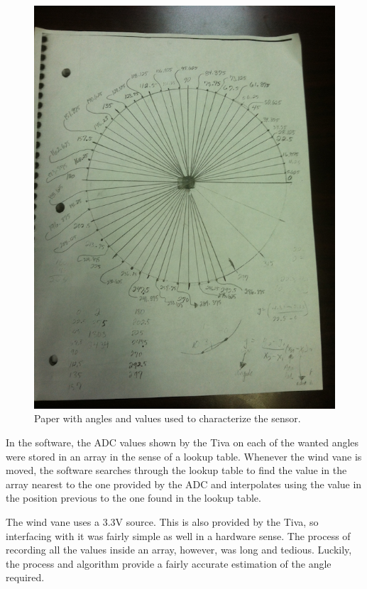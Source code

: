 		\begin{figure}[H]
			\centering
				\includegraphics[scale=0.1]{img/estimationDiagram}
			\caption{Paper with angles and values used to characterize the sensor.}
		\end{figure}
		
		In the software, the ADC values shown by the Tiva on each of the wanted angles were stored in an array in the sense of a lookup table. Whenever the wind vane is moved, the software searches through the lookup table to find the value in the array nearest to the one provided by the ADC and interpolates using the value in the position previous to the one found in the lookup table.
		
		The wind vane uses a 3.3V source. This is also provided by the Tiva, so interfacing with it was fairly simple as well in a hardware sense. The process of recording all the values inside an array, however, was long and tedious. Luckily, the process and algorithm provide a fairly accurate estimation of the angle required.
		
